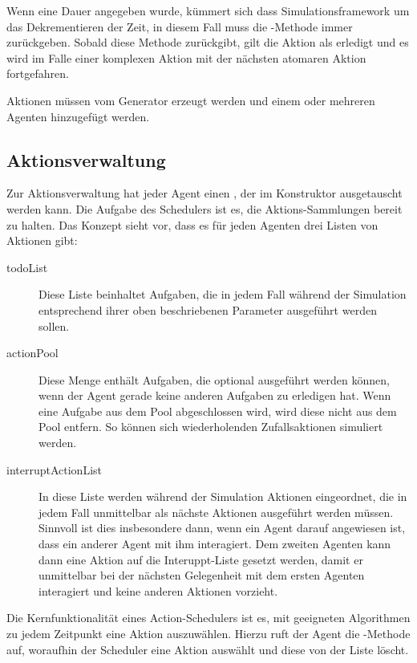 Wenn eine Dauer angegeben wurde, kümmert sich dass Simulationsframework um das Dekrementieren der Zeit, in diesem Fall muss die -Methode immer  zurückgeben. Sobald diese Methode  zurückgibt, gilt die Aktion als erledigt und es wird im Falle einer komplexen Aktion mit der nächsten atomaren Aktion fortgefahren.

Aktionen müssen vom Generator erzeugt werden und einem oder mehreren Agenten hinzugefügt werden.

\subsection{Aktionsverwaltung}\label{subsec:concept_actionhandling}
Zur Aktionsverwaltung hat jeder Agent einen , der im Konstruktor ausgetauscht werden kann. Die Aufgabe des Schedulers ist es, die Aktions-Sammlungen bereit zu halten. Das Konzept sieht vor, dass es für jeden Agenten drei Listen von Aktionen gibt:
\begin{description}
	\item[todoList] Diese Liste beinhaltet Aufgaben, die in jedem Fall während der Simulation entsprechend ihrer oben beschriebenen Parameter ausgeführt werden sollen.
	\item[actionPool] Diese Menge enthält Aufgaben, die optional ausgeführt werden können, wenn der Agent gerade keine anderen Aufgaben zu erledigen hat. Wenn eine Aufgabe aus dem Pool abgeschlossen wird, wird diese nicht aus dem Pool entfern. So können sich wiederholenden Zufallsaktionen simuliert werden.
	\item[interruptActionList] In diese Liste werden während der Simulation Aktionen eingeordnet, die in jedem Fall unmittelbar als nächste Aktionen ausgeführt werden müssen. Sinnvoll ist dies insbesondere dann, wenn ein Agent darauf angewiesen ist, dass ein anderer Agent mit ihm interagiert. Dem zweiten Agenten kann dann eine Aktion auf die Interuppt-Liste gesetzt werden, damit er unmittelbar bei der nächsten Gelegenheit mit dem ersten Agenten interagiert und keine anderen Aktionen vorzieht.
\end{description}

Die Kernfunktionalität eines Action-Schedulers ist es, mit geeigneten Algorithmen zu jedem Zeitpunkt eine Aktion auszuwählen. Hierzu ruft der Agent die -Methode auf, woraufhin der Scheduler eine Aktion auswählt und diese von der Liste löscht.


